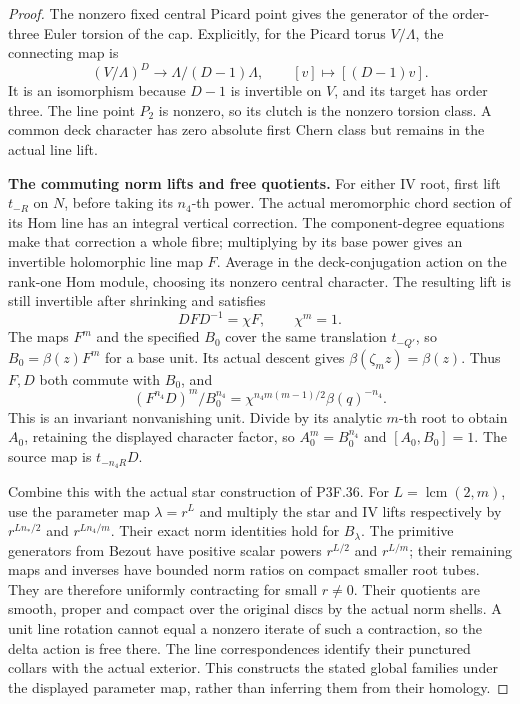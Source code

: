 \begin{proof}
The nonzero fixed central Picard point gives the generator of the
order-three Euler torsion of the cap. Explicitly, for the Picard
torus \(V/\Lambda\), the connecting map is
\[
 (V/\Lambda)^D\longrightarrow\Lambda/(D-1)\Lambda,
                  \qquad[v]\longmapsto[(D-1)v].
\]
It is an isomorphism because \(D-1\) is invertible on \(V\),
and its target has order three. The line point \(P_2\) is
nonzero, so its clutch is the nonzero torsion class. A common
deck character has zero absolute first Chern class but remains
in the actual line lift.

\par\medskip\noindent\textbf{The commuting norm lifts and free quotients.}
For either IV root, first lift \(t_{-R}\) on \(N\), before
taking its \(n_4\)-th power. The actual meromorphic chord section
of its Hom line has an integral vertical correction. The
component-degree equations make that correction a whole fibre;
multiplying by its base power gives an invertible holomorphic
line map \(F\). Average in the deck-conjugation action on the
rank-one Hom module, choosing its nonzero central character.
The resulting lift is still invertible after shrinking and satisfies
\[
                   DFD^{-1}=\chi F,\qquad\chi^m=1.
\]
The maps \(F^m\) and the specified \(B_0\) cover the same
translation \(t_{-Q'}\), so
\(B_0=\beta(z)F^m\) for a base unit. Its actual descent gives
\(\beta(\zeta_mz)=\beta(z)\). Thus \(F,D\) both commute
with \(B_0\), and
\[
 (F^{n_4}D)^m/B_0^{n_4}
              =\chi^{n_4m(m-1)/2}\beta(q)^{-n_4}.              \tag{P3F.38.2}
\]
This is an invariant nonvanishing unit. Divide by its analytic
\(m\)-th root to obtain \(A_0\), retaining the displayed
character factor, so
\(A_0^m=B_0^{n_4}\) and \([A_0,B_0]=1\).
The source map is \(t_{-n_4R}D\).

Combine this with the actual star construction of P3F.36. For
\(L=\operatorname{lcm}(2,m)\), use the parameter map
\(\lambda=r^L\) and multiply the star and IV lifts respectively
by \(r^{Ln_*/2}\) and \(r^{Ln_4/m}\). Their exact norm
identities hold for \(B_\lambda\). The primitive generators
from Bezout have positive scalar powers \(r^{L/2}\) and
\(r^{L/m}\); their remaining maps and inverses have bounded
norm ratios on compact smaller root tubes. They are therefore
uniformly contracting for small \(r\ne0\). Their quotients
are smooth, proper and compact over the original discs by the
actual norm shells. A unit line rotation cannot equal a nonzero
iterate of such a contraction, so the delta action is free there.
The line correspondences identify their punctured collars with
the actual exterior. This constructs the stated global families
under the displayed parameter map, rather than inferring them
from their homology.


\end{proof}
